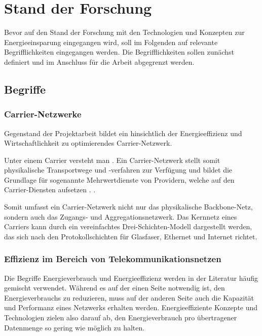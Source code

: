 \section{Stand der Forschung} \label{SdF}

Bevor auf den Stand der Forschung mit den Technologien und Konzepten zur Energieeinsparung eingegangen wird, soll im Folgenden auf relevante Begrifflichkeiten eingegangen werden. Die Begrifflichkeiten sollen zunächst definiert und im Anschluss für die Arbeit abgegrenzt werden.  

\subsection{Begriffe}

\subsubsection{Carrier-Netzwerke}
Gegenstand der Projektarbeit bildet ein hinsichtlich der Energieeffizienz und Wirtschaftlichkeit zu optimierendes Carrier-Netzwerk.

Unter einem Carrier versteht man  \cite{carrier}. Ein Carrier-Netzwerk stellt somit physikalische Transportwege und -verfahren zur Verfügung und bildet die Grundlage für sogenannte Mehrwertdienste von Providern, welche auf den Carrier-Diensten aufsetzen \cite{fassnacht} .  \cite{fassnacht}.

Somit umfasst ein Carrier-Netzwerk nicht nur das physikalische Backbone-Netz, sondern auch das Zugangs- und Aggregationsnetzwerk. Das Kernnetz eines Carriers kann durch ein vereinfachtes Drei-Schichten-Modell dargestellt werden, das sich nach den Protokollschichten für Glasfaser, Ethernet und Internet richtet. 

\subsubsection{Effizienz im Bereich von Telekommunikationsnetzen}
Die Begriffe Energieverbrauch und Energieeffizienz werden in der Literatur häufig gemischt verwendet. Während es auf der einen Seite notwendig ist, den Energieverbrauchs zu reduzieren, muss auf der anderen Seite auch die Kapazität und Performanz eines Netzwerks erhalten werden. Energieeffiziente Konzepte und Technologien zielen also darauf ab, den Energieverbrauch pro übertragener Datenmenge so gering wie möglich zu halten. \cite{aleksic2013}

